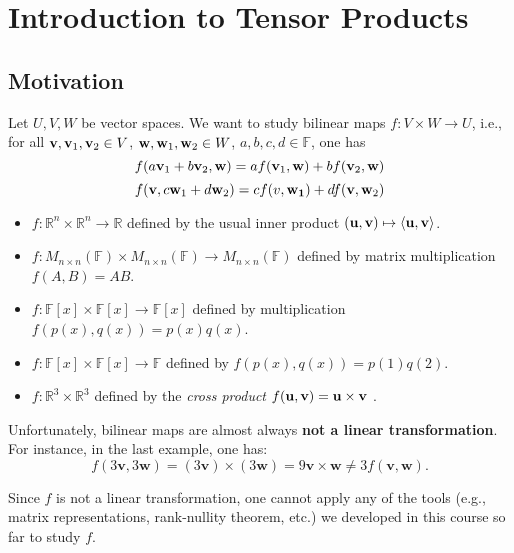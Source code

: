 \chapter{Introduction to Tensor Products}

\section{Motivation}
Let \( U, V, W \) be vector spaces. We want to study bilinear maps \( f : V \times W \to U \), i.e., for all \( {\bf v}, {\bf v}_1, {\bf v}_2 \in V \), \( {\bf w}, {\bf w}_1, {\bf w}_2 \in W \), \( a, b, c, d \in \mathbb{F} \), one has
\[
f(a{\bf v}_1 + b{\bf v}_2, {\bf w}) = a f({\bf v}_1, {\bf w}) + b f({\bf v}_2, {\bf w})
\]
\[
f({\bf v}, c{\bf w}_1 + d{\bf w}_2) = c f(v, {\bf w_1}) + d f({\bf v}, {\bf w}_2)
\]

\begin{example}
\begin{itemize}
\item \( f : \mathbb{R}^n \times \mathbb{R}^n \to \mathbb{R} \) defined by the usual inner product \( ({\bf u}, {\bf v}) \mapsto \langle {\bf u}, {\bf v} \rangle \).


    \item \( f : M_{n \times n}(\mathbb{F}) \times M_{n \times n}(\mathbb{F}) \to M_{n \times n}(\mathbb{F}) \) defined by matrix multiplication \( f(A, B) = AB \).

    \item \( f : \mathbb{F}[x] \times \mathbb{F}[x] \to \mathbb{F}[x] \) defined by multiplication \( f(p(x), q(x)) = p(x) q(x) \).
    
    \item \( f : \mathbb{F}[x] \times \mathbb{F}[x] \to \mathbb{F} \) defined by \( f(p(x), q(x)) = p(1) q(2) \).
    
    \item \( f : \mathbb{R}^3 \times \mathbb{R}^3 \) defined by the \emph{cross product} \( f({\bf u}, {\bf v}) = {\bf u} \times {\bf v} \) .
\end{itemize}
\end{example}

\noindent Unfortunately, bilinear maps are almost always \textbf{not a linear transformation}. For instance, in the last example, one has:
\[
f(3 \mathbf{v}, 3 \mathbf{w}) = (3 \mathbf{v}) \times (3 \mathbf{w}) = 9 \mathbf{v} \times \mathbf{w} \neq 3 f(\mathbf{v}, \mathbf{w}).
\]

Since \( f \) is not a linear transformation, one cannot apply any of the tools (e.g., matrix representations, rank-nullity theorem, etc.) we developed in this course so far to study \( f \).

